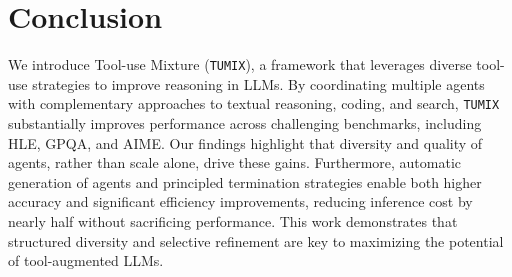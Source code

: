 \section{Conclusion}
We introduce Tool-use Mixture (\texttt{TUMIX}), a framework that leverages diverse tool-use strategies to improve reasoning in LLMs. By coordinating multiple agents with complementary approaches to textual reasoning, coding, and search, \texttt{TUMIX} substantially improves performance across challenging benchmarks, including HLE, GPQA, and AIME. Our findings highlight that diversity and quality of agents, rather than scale alone, drive these gains. Furthermore, automatic generation of agents and principled termination strategies enable both higher accuracy and significant efficiency improvements, reducing inference cost by nearly half without sacrificing performance. This work demonstrates that structured diversity and selective refinement are key to maximizing the potential of tool-augmented LLMs.